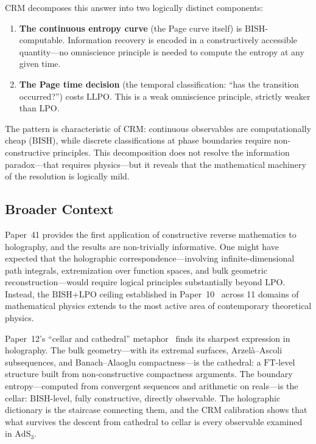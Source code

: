 \documentclass[11pt,a4paper]{article}
\theoremstyle{plain}
\theoremstyle{definition}
\newcommand{\LPO}{\ensuremath{\mathrm{LPO}}}
\newcommand{\LLPO}{\ensuremath{\mathrm{LLPO}}}
\newcommand{\BISH}{\ensuremath{\mathrm{BISH}}}
\newcommand{\FT}{\ensuremath{\mathrm{FT}}}
\newcommand{\AdS}{\ensuremath{\mathrm{AdS}}}
\begin{document}
CRM decomposes this answer into two logically distinct components:
\begin{enumerate}[nosep]
\item \textbf{The continuous entropy curve} (the Page curve itself)
  is $\BISH$-computable.  Information recovery is encoded in a
  constructively accessible quantity---no omniscience principle is needed
  to compute the entropy at any given time.
\item \textbf{The Page time decision} (the temporal classification:
  ``has the transition occurred?'') costs $\LLPO$.  This is a weak
  omniscience principle, strictly weaker than $\LPO$.
\end{enumerate}
The pattern is characteristic of CRM: continuous observables are
computationally cheap ($\BISH$), while discrete classifications at
phase boundaries require non-constructive principles.
This decomposition does not resolve the information paradox---that
requires physics---but it reveals that the mathematical machinery
of the resolution is logically mild.

\subsection{Broader Context}

Paper~41 provides the first application of constructive reverse
mathematics to holography, and the results are non-trivially informative.
One might have expected that the holographic correspondence---involving
infinite-dimensional path integrals, extremization over function spaces,
and bulk geometric reconstruction---would require logical principles
substantially beyond $\LPO$.  Instead, the $\BISH$+$\LPO$ ceiling
established in Paper~10~\cite{Lee26P10} across 11 domains of mathematical
physics extends to the most active area of contemporary theoretical
physics.

Paper~12's ``cellar and cathedral'' metaphor~\cite{Lee26P12} finds
its sharpest expression in holography.  The bulk geometry---with its
extremal surfaces, Arzel\`a--Ascoli subsequences, and Banach--Alaoglu
compactness---is the cathedral: a $\FT$-level structure built from
non-constructive compactness arguments.  The boundary entropy---computed
from convergent sequences and arithmetic on reals---is the cellar:
$\BISH$-level, fully constructive, directly observable.
The holographic dictionary is the staircase connecting them,
and the CRM calibration shows that what survives the descent from
cathedral to cellar is every observable examined in $\AdS_3$.
\end{document}
